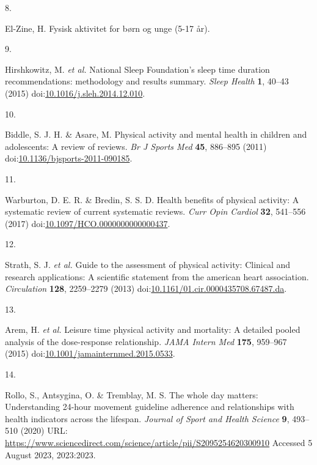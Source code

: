 \documentclass[
  10pt,
]{scrbook}
\newlength{\cslhangindent}
\newlength{\csllabelwidth}
\newlength{\cslentryspacingunit} %
\newenvironment{CSLReferences}[2] %
 {%
  \setlength{\parindent}{0pt}
  \ifodd #1
  \let\oldpar\par
  \def\par{\hangindent=\cslhangindent\oldpar}
  \fi
  \setlength{\parskip}{#2\cslentryspacingunit}
 }%
 {}
\newcommand{\CSLLeftMargin}[1]{\parbox[t]{\csllabelwidth}{#1}}
\newcommand{\CSLRightInline}[1]{\parbox[t]{\linewidth - \csllabelwidth}{#1}\break}
\let\originaltextbf\textbf
\renewcommand{\textbf}[1]{\textcolor{color1}{\originaltextbf{#1}}}
\begin{document}
\begin{CSLReferences}{0}{0}
\leavevmode{}%
\CSLLeftMargin{8. }%
\CSLRightInline{El-Zine, H. Fysisk aktivitet for børn og unge (5-17
år).}

\leavevmode{}%
\CSLLeftMargin{9. }%
\CSLRightInline{Hirshkowitz, M. \emph{et al.} National Sleep
Foundation's sleep time duration recommendations: methodology and
results summary. \emph{Sleep Health} \textbf{1}, 40--43 (2015)
doi:\href{https://doi.org/10.1016/j.sleh.2014.12.010}{10.1016/j.sleh.2014.12.010}.}

\leavevmode{}%
\CSLLeftMargin{10. }%
\CSLRightInline{Biddle, S. J. H. \& Asare, M. Physical activity and
mental health in children and adolescents: A review of reviews. \emph{Br
J Sports Med} \textbf{45}, 886--895 (2011)
doi:\href{https://doi.org/10.1136/bjsports-2011-090185}{10.1136/bjsports-2011-090185}.}

\leavevmode{}%
\CSLLeftMargin{11. }%
\CSLRightInline{Warburton, D. E. R. \& Bredin, S. S. D. Health benefits
of physical activity: A systematic review of current systematic reviews.
\emph{Curr Opin Cardiol} \textbf{32}, 541--556 (2017)
doi:\href{https://doi.org/10.1097/HCO.0000000000000437}{10.1097/HCO.0000000000000437}.}

\leavevmode{}%
\CSLLeftMargin{12. }%
\CSLRightInline{Strath, S. J. \emph{et al.} Guide to the assessment of
physical activity: Clinical and research applications: A scientific
statement from the american heart association. \emph{Circulation}
\textbf{128}, 2259--2279 (2013)
doi:\href{https://doi.org/10.1161/01.cir.0000435708.67487.da}{10.1161/01.cir.0000435708.67487.da}.}

\leavevmode{}%
\CSLLeftMargin{13. }%
\CSLRightInline{Arem, H. \emph{et al.} Leisure time physical activity
and mortality: A detailed pooled analysis of the dose-response
relationship. \emph{{JAMA} Intern Med} \textbf{175}, 959--967 (2015)
doi:\href{https://doi.org/10.1001/jamainternmed.2015.0533}{10.1001/jamainternmed.2015.0533}.}

\leavevmode{}%
\CSLLeftMargin{14. }%
\CSLRightInline{Rollo, S., Antsygina, O. \& Tremblay, M. S. The whole
day matters: Understanding 24-hour movement guideline adherence and
relationships with health indicators across the lifespan. \emph{Journal
of Sport and Health Science} \textbf{9}, 493--510 (2020) URL:
\url{https://www.sciencedirect.com/science/article/pii/S2095254620300910}
Accessed 5 August 2023, 2023:2023.}


\end{CSLReferences}
\end{document}
